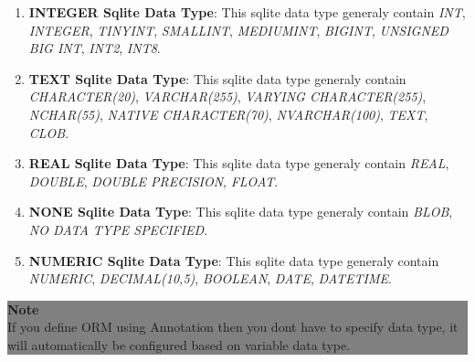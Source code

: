 \begin{enumerate}

	\item \small \textbf{INTEGER Sqlite Data Type}: This sqlite data type generaly contain \textit{INT}, \textit{INTEGER}, \textit{TINYINT}, \textit{SMALLINT}, \textit{MEDIUMINT}, \textit{BIGINT}, \textit{UNSIGNED BIG INT}, \textit{INT2}, \textit{INT8}.
	
	\item \small \textbf{TEXT Sqlite Data Type}: This sqlite data type generaly contain \textit{CHARACTER(20)}, \textit{VARCHAR(255)}, \textit{VARYING CHARACTER(255)}, \textit{NCHAR(55)}, \textit{NATIVE CHARACTER(70)}, \textit{NVARCHAR(100)}, \textit{TEXT}, \textit{CLOB}.

	\item \small \textbf{REAL Sqlite Data Type}: This sqlite data type generaly contain \textit{REAL}, \textit{DOUBLE}, \textit{DOUBLE PRECISION}, \textit{FLOAT}.
	
	\item \small \textbf{NONE Sqlite Data Type}: This sqlite data type generaly contain \textit{BLOB}, \textit{NO DATA TYPE SPECIFIED}.

	\item \small \textbf{NUMERIC Sqlite Data Type}: This sqlite data type generaly contain \textit{NUMERIC}, \textit{DECIMAL(10,5)}, \textit{BOOLEAN}, \textit{DATE}, \textit{DATETIME}.

\end{enumerate}


					\begin{center}
						\colorbox{grey}{
						\parbox[t]{.8\linewidth}{
							\fontsize{11pt}{11pt}\selectfont %
							\vspace*{0.1cm} %
		
							\hfill \textbf{Note} \\
							If you define ORM using Annotation then you dont have to specify data type, it will automatically be configured based on variable data type.
				
							\vspace*{0.0cm} %
						}
					}

					\end{center}



